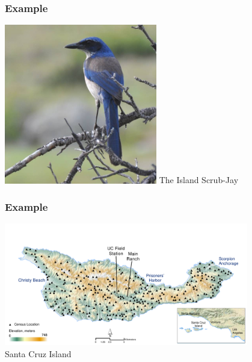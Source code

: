 \documentclass[color=usenames,dvipsnames]{beamer}\usepackage[]{graphicx}\usepackage[]{color}
\begin{document}
\begin{frame}[plain]
  \frametitle{Example}
  \Huge
  \begin{center}
    \includegraphics[width=0.5\textwidth]{../../lectures/modeling-intro/figs/issj}
    The Island Scrub-Jay
  \end{center}
\end{frame}



\begin{frame}[plain]
  \frametitle{Example}
  \Huge
  \begin{center}
    \includegraphics[width=0.8\textwidth]{../../lectures/modeling-intro/figs/Santa-Cruz} \\
    Santa Cruz Island
  \end{center}
\end{frame}
\end{document}
